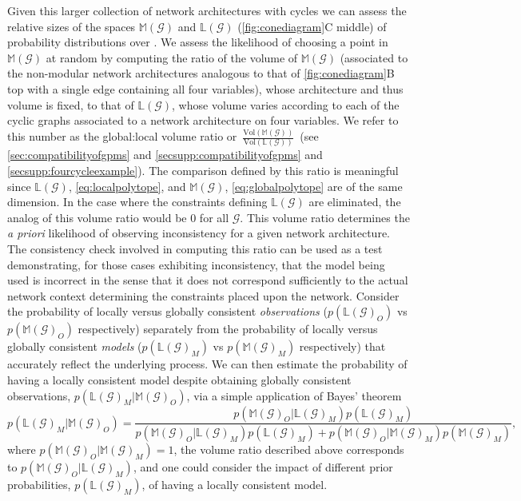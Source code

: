 Given this larger collection of network architectures with cycles we can assess the relative sizes of the spaces $\mathbb{M}(\mathcal{G})$ and $\mathbb{L}(\mathcal{G})$ (\autoref{fig:conediagram}C middle) of probability distributions over \gnpm{}. We assess the likelihood of choosing a point in $\mathbb{M}(\mathcal{G})$ at random by computing the ratio of the volume of $\mathbb{M}(\mathcal{G})$ (associated to the non-modular network architectures analogous to that of \autoref{fig:conediagram}B top with a single edge containing all four variables), whose architecture and thus volume is fixed, to that of $\mathbb{L}(\mathcal{G})$, whose volume varies according to each of the cyclic graphs associated to a network architecture on four variables. We refer to this number as the global:local volume ratio or~$\frac{\text{Vol}(\mathbb{M}(\mathcal{G}))}{\text{Vol}(\mathbb{L}(\mathcal{G}))}$~(see \autoref{sec:compatibilityofgpms} and  \autoref{secsupp:compatibilityofgpms} and \autoref{secsupp:fourcycleexample}). The comparison defined by this ratio is meaningful since $\mathbb{L}(\mathcal{G})$, \autoref{eq:localpolytope}, and $\mathbb{M}(\mathcal{G})$, \autoref{eq:globalpolytope} are of the same dimension. In the case where the constraints defining $\mathbb{L}(\mathcal{G})$ are eliminated, the analog of this volume ratio would be $0$ for all $\mathcal{G}$. This volume ratio determines the \emph{a priori} likelihood of observing inconsistency for a given network architecture. The consistency check involved in computing this ratio can be used as a test demonstrating, for those cases exhibiting inconsistency, that the model being used is incorrect in the sense that it does not correspond sufficiently to the actual network context determining the constraints placed upon the network. Consider the probability of locally versus globally consistent \emph{observations} ($p(\mathbb{L}(\mathcal{G})_O)$  vs $p(\mathbb{M}(\mathcal{G})_O)$ respectively) separately from the probability of locally versus globally consistent \emph{models} ($p(\mathbb{L}(\mathcal{G})_M)$  vs $p(\mathbb{M}(\mathcal{G})_M)$ respectively) that accurately reflect the underlying process. We can then estimate the probability of having a locally consistent model despite obtaining globally consistent observations, $p(\mathbb{L}(\mathcal{G})_M | \mathbb{M}(\mathcal{G})_O)$, via a simple application of Bayes' theorem
$$
p(\mathbb{L}(\mathcal{G})_M | \mathbb{M}(\mathcal{G})_O) = \frac{p(\mathbb{M}(\mathcal{G})_O | \mathbb{L}(\mathcal{G})_M)p(\mathbb{L}(\mathcal{G})_M)}{p(\mathbb{M}(\mathcal{G})_O | \mathbb{L}(\mathcal{G})_M)p(\mathbb{L}(\mathcal{G})_M) + p(\mathbb{M}(\mathcal{G})_O | \mathbb{M}(\mathcal{G})_M)p(\mathbb{M}(\mathcal{G})_M)},
$$
where $p(\mathbb{M}(\mathcal{G})_O | \mathbb{M}(\mathcal{G})_M)=1$, the volume ratio described above corresponds to $p(\mathbb{M}(\mathcal{G})_O | \mathbb{L}(\mathcal{G})_M)$, and one could consider the impact of different prior probabilities, $p(\mathbb{L}(\mathcal{G})_M)$, of having a locally consistent model.

